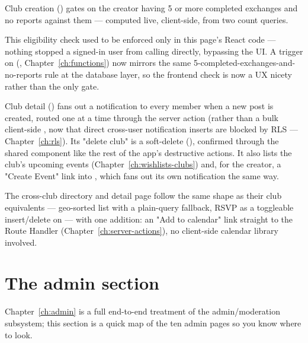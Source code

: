 Club creation () gates on the creator having 5 or more completed exchanges and no reports against them — computed live, client-side, from two count queries.

\begin{olknote}
This eligibility check used to be enforced only in this page's React code — nothing stopped a signed-in user from calling  directly, bypassing the UI. A  trigger on  (, Chapter~\ref{ch:functions}) now mirrors the same 5-completed-exchanges-and-no-reports rule at the database layer, so the frontend check is now a UX nicety rather than the only gate.
\end{olknote}

Club detail () fans out a notification to every member when a new post is created, routed one at a time through the  server action (rather than a bulk client-side , now that direct cross-user notification inserts are blocked by RLS — Chapter~\ref{ch:rls}). Its "delete club" is a soft-delete (), confirmed through the shared  component like the rest of the app's destructive actions. It also lists the club's upcoming events (Chapter~\ref{ch:wishlists-clubs}) and, for the creator, a "Create Event" link into , which fans out its own  notification the same way.

The cross-club  directory and  detail page follow the same shape as their club equivalents — geo-sorted list with a plain-query fallback, RSVP as a toggleable insert/delete on  — with one addition: an "Add to calendar" link straight to the  Route Handler (Chapter~\ref{ch:server-actions}), no client-side calendar library involved.

\section{The admin section}

Chapter~\ref{ch:admin} is a full end-to-end treatment of the admin/moderation subsystem; this section is a quick map of the ten admin pages so you know where to look.

